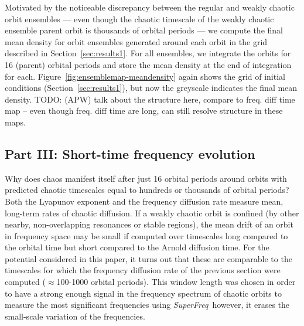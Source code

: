 \documentclass[letterpaper,12pt,preprint]{aastex}
\newcommand{\project}[1]{\textsl{#1}}
\newcommand{\superfreq}{\project{SuperFreq}}
\newcommand{\todo}[2]{{\color{red} TODO: (\MakeUppercase{#1}) #2}}
\begin{document}
Motivated by the noticeable discrepancy between the regular and weakly chaotic orbit ensembles --- even though the chaotic timescale of the weakly chaotic ensemble parent orbit is thousands of orbital periods --- we compute the final mean density for orbit ensembles generated around each orbit in the grid described in Section~\ref{sec:results1}. For all ensembles, we integrate the orbits for 16 (parent) orbital periods and store the mean density at the end of integration for each. Figure~\ref{fig:ensemblemap-meandensity} again shows the grid of initial conditions (Section~\ref{sec:results1}), but now the greyscale indicates the final mean density. \todo{apw}{talk about the structure here, compare to freq. diff time map -- even though freq. diff time are long, can still resolve structure in these maps.}

\subsection{Part III: Short-time frequency evolution}\label{sec:results3}

Why does chaos manifest itself after just 16 orbital periods around orbits with predicted chaotic timescales equal to hundreds or thousands of orbital periods? Both the Lyapunov exponent and the frequency diffusion rate measure mean, long-term rates of chaotic diffusion. If a weakly chaotic orbit is confined (by other nearby, non-overlapping resonances or stable regions), the mean drift of an orbit in frequency space may be small if computed over timescales long compared to the orbital time but short compared to the Arnold diffusion time. For the potential considered in this paper, it turns out that these are comparable to the timescales for which the frequency diffusion rate of the previous section were computed ($\approx$100-1000 orbital periods). This window length was chosen in order to have a strong enough signal in the frequency spectrum of chaotic orbits to measure the most significant frequencies using \superfreq\, however, it erases the small-scale variation of the frequencies. 
\end{document}
